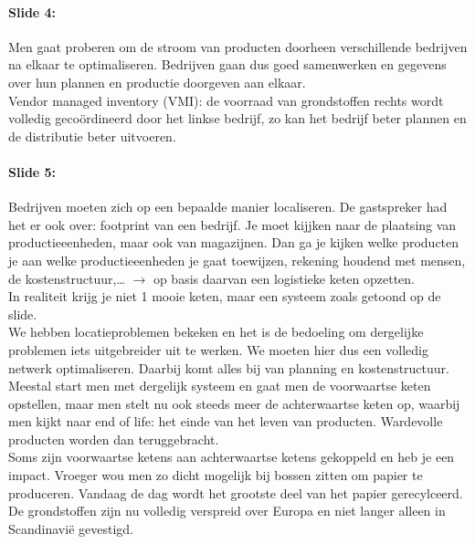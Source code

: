 \documentclass[10pt,a4paper]{report}
\begin{document}
\paragraph{Slide 4:} Men gaat proberen om de stroom van producten doorheen verschillende bedrijven na elkaar te optimaliseren. Bedrijven gaan dus goed samenwerken en gegevens over hun plannen en productie doorgeven aan elkaar. \\
Vendor managed inventory (VMI): de voorraad van grondstoffen rechts wordt volledig geco\"ordineerd door het linkse bedrijf, zo kan het bedrijf beter plannen en de distributie beter uitvoeren.

\paragraph{Slide 5:} Bedrijven moeten zich op een bepaalde manier localiseren. De gastspreker had het er ook over: footprint van een bedrijf. Je moet kijjken naar de plaatsing van productieeenheden, maar ook van magazijnen. Dan ga je kijken welke producten je aan welke productieeenheden je gaat toewijzen, rekening houdend met mensen, de kostenstructuur,… $\rightarrow$ op basis daarvan een logistieke keten opzetten. \\
In realiteit krijg je niet 1 mooie keten, maar een systeem zoals getoond op de slide. \\
We hebben locatieproblemen bekeken en het is de bedoeling om dergelijke problemen iets uitgebreider uit te werken. We moeten hier dus een volledig netwerk optimaliseren. Daarbij komt alles bij van planning en kostenstructuur.\\
Meestal start men met dergelijk systeem en gaat men de voorwaartse keten opstellen, maar men stelt nu ook steeds meer de achterwaartse keten op, waarbij men kijkt naar end of life: het einde van het leven van producten. Wardevolle producten worden dan teruggebracht. \\
Soms zijn voorwaartse ketens aan achterwaartse ketens gekoppeld en heb je een impact. Vroeger wou men zo dicht mogelijk bij bossen zitten om papier te produceren. Vandaag de dag wordt het grootste deel van het papier gerecylceerd. De grondstoffen zijn nu volledig verspreid over Europa en niet langer alleen in Scandinavi\"e gevestigd.
\end{document}
